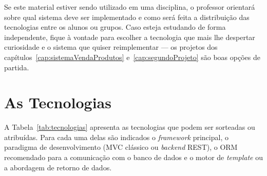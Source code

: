 Se este material estiver sendo utilizado em uma disciplina, o professor orientará sobre qual sistema deve ser implementado e como será feita a distribuição das tecnologias entre os alunos ou grupos. Caso esteja estudando de forma independente, fique à vontade para escolher a tecnologia que mais lhe despertar curiosidade e o sistema que quiser reimplementar --- os projetos dos capítulos~\ref{cap:sistemaVendaProdutos} e~\ref{cap:segundoProjeto} são boas opções de partida.


\section{As Tecnologias}

A Tabela~\ref{tab:tecnologias} apresenta as tecnologias que podem ser sorteadas ou atribuídas. Para cada uma delas são indicados o \textit{framework} principal, o paradigma de desenvolvimento (MVC clássico ou \textit{backend} REST), o ORM recomendado para a comunicação com o banco de dados e o motor de \textit{template} ou a abordagem de retorno de dados.

